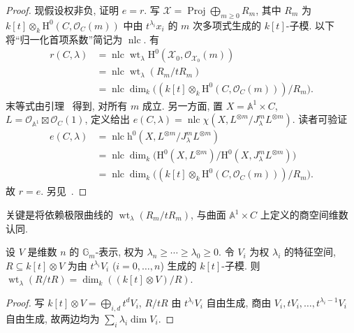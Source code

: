 \begin{proof}
现假设权非负, 证明 $e=r$. 写 $\mathcal X=\operatorname{Proj}\bigoplus_{m\geq0}R_m$, 其中 $R_m$ 为 $k[t]\otimes_k\mathrm H^0(C,\allowbreak \mathcal O_C(m))$ 中由 $t^{\lambda_i}x_i$ 的 $m$ 次多项式生成的 $k[t]$-子模. 以下将``归一化首项系数''简记为 $\operatorname{nlc}$. 有
\begin{equation}\label{src:6.8.12}
\begin{aligned}
r(C,\lambda)&=\operatorname{nlc}\operatorname{wt}_\lambda\mathrm H^0(\mathcal X_0,\mathcal O_{\mathcal X_0}(m))\\
&=\operatorname{nlc}\operatorname{wt}_\lambda(R_m/tR_m)\\
&=\operatorname{nlc}\dim_k\bigl((k[t]\otimes_k\mathrm H^0(C,\mathcal O_C(m)))/R_m\bigr).
\end{aligned}
\end{equation}
末等式由引理~ 得到, 对所有 $m$ 成立. 另一方面, 置 $X=\mathbb A^1\times C$, $L=\mathcal O_{\mathbb A^1}\boxtimes\mathcal O_C(1)$, 定义给出 $e(C,\allowbreak \lambda)=\operatorname{nlc}\chi(X,\allowbreak L^{\otimes m}/J_\lambda^mL^{\otimes m})$. 读者可验证
\begin{equation}\label{src:6.8.13}
\begin{aligned}
e(C,\lambda)&=\operatorname{nlc}\mathrm h^0(X,L^{\otimes m}/J_\lambda^mL^{\otimes m})\\
&=\operatorname{nlc}\dim_k\bigl(\mathrm H^0(X,L^{\otimes m})/\mathrm H^0(X,J_\lambda^mL^{\otimes m})\bigr)\\
&=\operatorname{nlc}\dim_k\bigl((k[t]\otimes_k\mathrm H^0(C,\mathcal O_C(m)))/R_m\bigr).
\end{aligned}
\end{equation}
故 $r=e$. 另见~\cite[命题 2.6, 定理 2.9]{Mum77}.
\end{proof}
关键是将依赖极限曲线的 $\operatorname{wt}_\lambda(R_m/tR_m)$, 与曲面 $\mathbb A^1\times C$ 上定义的商空间维数认同.
\begin{lemma}\label{src:6.8.14}
设 $V$ 是维数 $n$ 的 $\mathbb G_m$-表示, 权为 $\lambda_n\geq\cdots\geq\lambda_0\geq0$. 令 $V_i$ 为权 $\lambda_i$ 的特征空间, $R\subseteq k[t]\otimes V$ 为由 $t^{\lambda_i}V_i$ ($i=0,\allowbreak \ldots,\allowbreak n$) 生成的 $k[t]$-子模. 则 $\operatorname{wt}_\lambda(R/tR)=\dim_k((k[t]\otimes V)/R)$.
\end{lemma}
\begin{proof}
写 $k[t]\otimes V=\bigoplus_{i,\allowbreak d}t^dV_i$, $R/tR$ 由 $t^{\lambda_i}V_i$ 自由生成, 商由 $V_i,\allowbreak tV_i,\allowbreak \ldots,\allowbreak t^{\lambda_i-1}V_i$ 自由生成, 故两边均为 $\sum_i\lambda_i\dim V_i$.
\end{proof}
